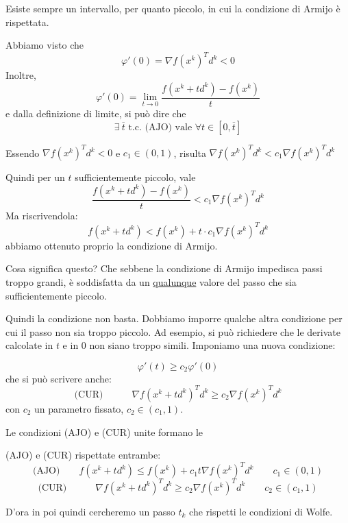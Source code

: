 \begin{property}
\label{prop:condizione-armijo-sempre-valida-in-intervallo} Esiste
sempre un intervallo, per quanto piccolo, in cui la condizione di
Armijo \`e rispettata.
\begin{thproof} Abbiamo visto che
$$\varphi'(0) = \nabla f(x^{k})^{T} d^{k} < 0 $$
Inoltre,
$$ \varphi'(0) = \lim_{t \to 0} \frac{f(x^{k} + td^{k}) - f(x^{k})}{t}$$
e dalla definizione di limite, si può dire che
$$ \exists  ~ \overline{t} \text{ t.c. (AJO) vale } \forall t \in [ 0, \overline{t}]$$

Essendo $\nabla f (x^k)^T d^k < 0$ e $c_1 \in (0,1)$, risulta $\nabla
f (x^k)^T d^k < c_1 \nabla f (x^k)^T d^k$

Quindi per un $t$ sufficientemente piccolo, vale
$$ \frac{f(x^{k} + td^{k}) - f(x^{k})}{t} < c_1 \nabla f (x^k)^T d^k $$
Ma riscrivendola:
$$ f(x^{k} + td^{k}) < f(x^{k}) + t \cdot c_1 \nabla f (x^k)^T d^k $$
abbiamo ottenuto proprio la condizione di Armijo.
\end{thproof}
\end{property} Cosa significa questo? Che sebbene la condizione di
Armijo impedisca passi troppo grandi, \`e soddisfatta da un
\underline{qualunque} valore del passo che sia sufficientemente
piccolo.

Quindi la condizione non basta. Dobbiamo imporre qualche altra
condizione per cui il passo non sia troppo piccolo. Ad esempio, si può
richiedere che le derivate calcolate in $t$ e in $0$ non siano troppo
simili. Imponiamo una nuova condizione:
\begin{defn}
\label{def:condizione-curvatura}
$$ \varphi'(t) \geq c_2 \varphi'(0)$$
che si può scrivere anche:
$$  \text{(CUR)} \qquad \quad \nabla f(x^{k} + td^{k})^{T} d^{k} \geq c_2 \nabla f(x^{k})^{T} d^{k}$$
con $c_2$ un parametro fissato, $c_2 \in (c_1, 1)$.
\end{defn}

Le condizioni (AJO) e (CUR) unite formano le
\begin{defn}
\label{defn:condizioni-wolfe} (AJO) e (CUR) rispettate entrambe:
$$  \text{(AJO)} \qquad  f(x^{k}+ td^{k}) \leq  f(x^{k}) + c_1 t \nabla f(x^{k})^{T} d^{k}\qquad c_1\in (0,1)$$
$$  \text{(CUR)} \qquad \quad \nabla f(x^{k} + td^{k})^{T} d^{k} \geq c_2 \nabla f(x^{k})^{T} d^{k} \qquad c_2 \in (c_1, 1)$$
\end{defn}

D'ora in poi quindi cercheremo un passo $t_k$ che rispetti le
condizioni di Wolfe.

